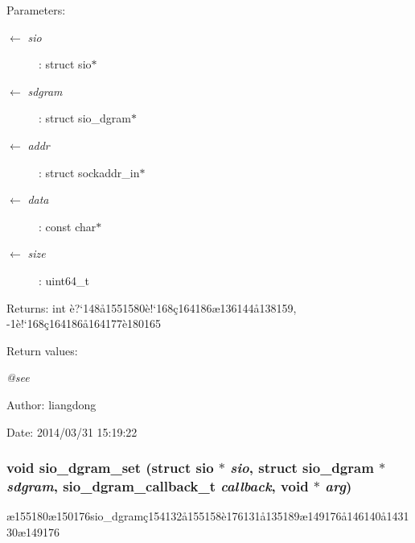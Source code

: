 \begin{Desc}
\item[Parameters:]
\begin{description}
\item[\mbox{$\leftarrow$} {\em sio}]: struct sio$\ast$ \item[\mbox{$\leftarrow$} {\em sdgram}]: struct sio\_\-dgram$\ast$ \item[\mbox{$\leftarrow$} {\em addr}]: struct sockaddr\_\-in$\ast$ \item[\mbox{$\leftarrow$} {\em data}]: const char$\ast$ \item[\mbox{$\leftarrow$} {\em size}]: uint64\_\-t \end{description}
\end{Desc}
\begin{Desc}
\item[Returns:]int \`{e}?`148\aa{}1551580\`{e}!`168\c{c}164186\ae{}136144\aa{}138159, -1\`{e}!`168\c{c}164186\aa{}164177\`{e}180165 \end{Desc}
\begin{Desc}
\item[Return values:]
\begin{description}
\item[{\em @see}]\end{description}
\end{Desc}
\begin{Desc}
\item[Author:]liangdong \end{Desc}
\begin{Desc}
\item[Date:]2014/03/31 15:19:22 \end{Desc}
\subsubsection{\setlength{\rightskip}{0pt plus 5cm}void sio\_\-dgram\_\-set (struct sio $\ast$ {\em sio}, struct sio\_\-dgram $\ast$ {\em sdgram}, sio\_\-dgram\_\-callback\_\-t {\em callback}, void $\ast$ {\em arg})}\label{sio__dgram_8h_a5}


\ae{}155180\ae{}150176sio\_\-dgram\c{c}154132\aa{}155158\`{e}176131\aa{}135189\ae{}149176\aa{}146140\aa{}143130\ae{}149176 

